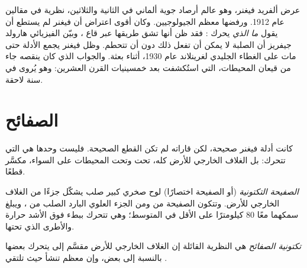 \begin{history}
عرض ألفريد فيغنر، وهو عالم أرصاد جوية ألماني في الثانية والثلاثين، نظرية
 في مقالين عام 1912. ورفضها معظم الجيولوجيين.
وكان أقوى اعتراض أن فيغنر لم يستطع أن يقول \emph{ما الذي} يحرك
: فقد ظن أنها تشق طريقها عبر  قاع
، وبيّن الفيزيائي هارولد جيفريز أن  الصلبة لا يمكن
أن تفعل ذلك دون أن تتحطم. وظل فيغنر يجمع الأدلة حتى
مات على الغطاء الجليدي لغرينلاند عام 1930، أثناء بعثة. والجواب
الذي كان ينقصه جاء من قيعان المحيطات، التي استُكشفت بعد خمسينيات القرن العشرين: وهو
يُروى في سنة لاحقة.
\end{history}

\section{الصفائح}

كانت أدلة فيغنر صحيحة، لكن قاراته لم تكن القطع الصحيحة. فليست
 وحدها هي التي تتحرك: بل الغلاف الخارجي للأرض كله،
تحت  وتحت المحيطات على السواء، مكسَّر قطعًا.

\begin{definition}\label{def:g7:plate-tectonics:plate}
\emph{الصفيحة التكتونية} (أو الصفيحة اختصارًا)
لوح صخري كبير صلب يشكّل جزءًا من الغلاف الخارجي للأرض.
وتتكون الصفيحة من  ومن الجزء العلوي البارد الصلب من
، ويبلغ سمكهما معًا 80 كيلومترًا على الأقل في المتوسط؛ وهي تتحرك ببطء
فوق  الأشد حرارة والأطرى الذي تحتها.
\end{definition}

\begin{definition}\label{def:g7:plate-tectonics:plate-tectonics}
\emph{تكتونية الصفائح} هي النظرية القائلة إن الغلاف
الخارجي للأرض مقسَّم إلى  يتحرك بعضها بالنسبة إلى
بعض، وإن معظم   
تنشأ حيث تلتقي .
\end{definition}

